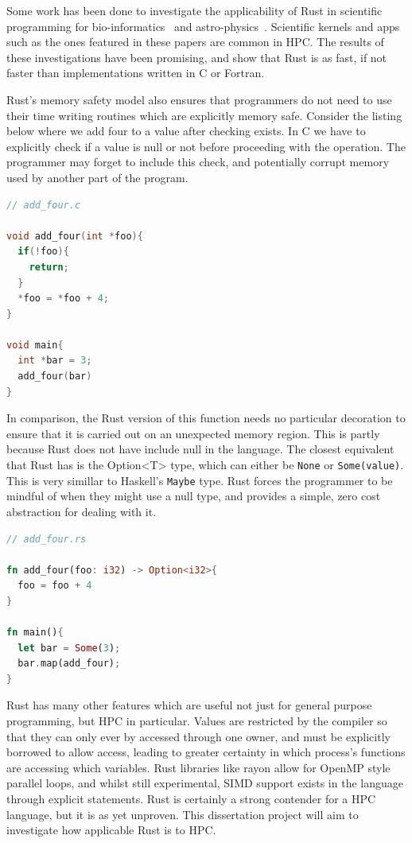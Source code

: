 \documentclass{report}
\begin{document}
Some work has been done to investigate the applicability of Rust in scientific programming for bio-informatics~\cite{bioinformatics} and astro-physics~\cite{blanco-cuaresma_bolmont_2016}. Scientific kernels and apps such as the ones featured in these papers are common in HPC. The results of these investigations have been promising, and show that Rust is as fast, if not faster than implementations written in C or Fortran.

Rust's memory safety model also ensures that programmers do not need to use their time writing routines which are explicitly memory safe. Consider the listing below where we add four to a value after checking exists. In C we have to explicitly check if a value is null or not before proceeding with the operation. The programmer may forget to include this check, and potentially corrupt memory used by another part of the program.

\begin{lstlisting}[language=C]
// add_four.c

void add_four(int *foo){
  if(!foo){
    return;
  }
  *foo = *foo + 4;
}

void main{
  int *bar = 3;
  add_four(bar)
}
\end{lstlisting}
In comparison, the Rust version of this function needs no particular decoration to ensure that it is carried out on an unexpected memory region. This is partly because Rust does not have include null in the language. The closest equivalent that Rust has is the Option<T> type, which can either be \texttt{None} or \texttt{Some(value)}. This is very simillar to Haskell's \texttt{Maybe} type. Rust forces the programmer to be mindful of when they might use a null type, and provides a simple, zero cost abstraction for dealing with it.
\begin{lstlisting}[language=Rust]
// add_four.rs

fn add_four(foo: i32) -> Option<i32>{
  foo = foo + 4
}

fn main(){
  let bar = Some(3);
  bar.map(add_four);
}
\end{lstlisting}

Rust has many other features which are useful not just for general purpose programming, but HPC in particular. Values are restricted by the compiler so that they can only ever by accessed through one owner, and must be explicitly borrowed to allow access, leading to greater certainty in which process's functions are accessing which variables. Rust libraries like rayon allow for OpenMP style parallel loops, and whilst still experimental, SIMD support exists in the language through explicit statements. Rust is certainly a strong contender for a HPC language, but it is as yet unproven. This dissertation project will aim to investigate how applicable Rust is to HPC.
\end{document}
